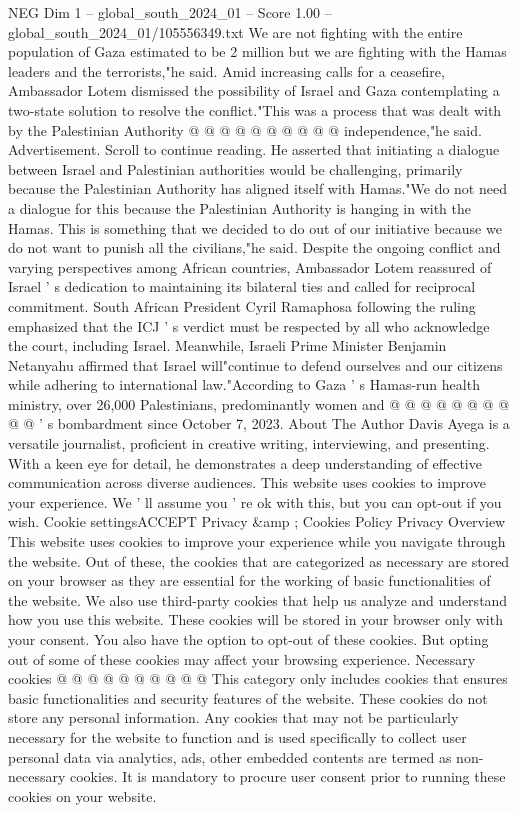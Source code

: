 \begin{textsample}{NEG Dim 1 – global\_south\_2024\_01 – Score 1.00 – global\_south\_2024\_01/105556349.txt}
We are not fighting with the entire population of Gaza estimated to be 2 million but we are fighting with the Hamas leaders and the terrorists,"he said.
Amid increasing calls for a ceasefire, Ambassador Lotem dismissed the possibility of Israel and Gaza contemplating a two-state solution to resolve the conflict."This was a process that was dealt with by the Palestinian Authority @ @ @ @ @ @ @ @ @ @ independence,"he said.
Advertisement.
Scroll to continue reading.
He asserted that initiating a dialogue between Israel and Palestinian authorities would be challenging, primarily because the Palestinian Authority has aligned itself with Hamas."We do not need a dialogue for this because the Palestinian Authority is hanging in with the Hamas.
This is something that we decided to do out of our initiative because we do not want to punish all the civilians,"he said.
Despite the ongoing conflict and varying perspectives among African countries, Ambassador Lotem reassured of Israel ' s dedication to maintaining its bilateral ties and called for reciprocal commitment.
South African President Cyril Ramaphosa following the ruling emphasized that the ICJ ' s verdict must be respected by all who acknowledge the court, including Israel.
Meanwhile, Israeli Prime Minister Benjamin Netanyahu affirmed that Israel will"continue to defend ourselves and our citizens while adhering to international law."According to Gaza ' s Hamas-run health ministry, over 26,000 Palestinians, predominantly women and @ @ @ @ @ @ @ @ @ @ ' s bombardment since October 7, 2023.
About The Author Davis Ayega is a versatile journalist, proficient in creative writing, interviewing, and presenting.
With a keen eye for detail, he demonstrates a deep understanding of effective communication across diverse audiences.
This website uses cookies to improve your experience.
We ' ll assume you ' re ok with this, but you can opt-out if you wish.
Cookie settingsACCEPT Privacy \&amp ; Cookies Policy Privacy Overview This website uses cookies to improve your experience while you navigate through the website.
Out of these, the cookies that are categorized as necessary are stored on your browser as they are essential for the working of basic functionalities of the website.
We also use third-party cookies that help us analyze and understand how you use this website.
These cookies will be stored in your browser only with your consent.
You also have the option to opt-out of these cookies.
But opting out of some of these cookies may affect your browsing experience.
Necessary cookies @ @ @ @ @ @ @ @ @ @ This category only includes cookies that ensures basic functionalities and security features of the website.
These cookies do not store any personal information.
Any cookies that may not be particularly necessary for the website to function and is used specifically to collect user personal data via analytics, ads, other embedded contents are termed as non-necessary cookies.
It is mandatory to procure user consent prior to running these cookies on your website.

\end{textsample}
